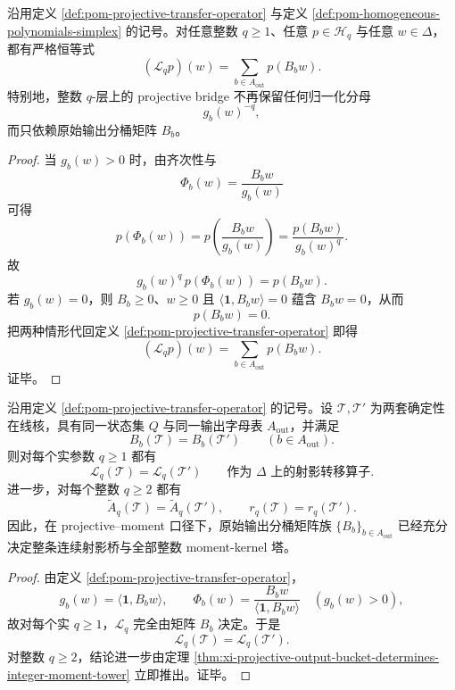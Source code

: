 \begin{theorem}\label{thm:xi-time-part9zj-integer-q-projective-bridge-denominator-annihilation}
沿用定义 \ref{def:pom-projective-transfer-operator} 与定义 \ref{def:pom-homogeneous-polynomials-simplex} 的记号。对任意整数 \(q\ge 1\)、任意 \(p\in\mathcal H_q\) 与任意 \(w\in\Delta\)，都有严格恒等式
\[
(\mathcal L_q p)(w)=\sum_{b\in A_{\mathrm{out}}}p(B_bw).
\]
特别地，整数 \(q\)-层上的 projective bridge 不再保留任何归一化分母
\[
g_b(w)^{-q},
\]
而只依赖原始输出分桶矩阵 \(B_b\)。
\end{theorem}
\begin{proof}
当 \(g_b(w)>0\) 时，由齐次性与
\[
\Phi_b(w)=\frac{B_bw}{g_b(w)}
\]
可得
\[
p(\Phi_b(w))
=
p\!\left(\frac{B_bw}{g_b(w)}\right)
=
\frac{p(B_bw)}{g_b(w)^q}.
\]
故
\[
g_b(w)^q\,p(\Phi_b(w))=p(B_bw).
\]
若 \(g_b(w)=0\)，则 \(B_b\ge 0\)、\(w\ge 0\) 且 \(\langle\mathbf 1,B_bw\rangle=0\) 蕴含 \(B_bw=0\)，从而
\[
p(B_bw)=0.
\]
把两种情形代回定义 \ref{def:pom-projective-transfer-operator} 即得
\[
(\mathcal L_q p)(w)=\sum_{b\in A_{\mathrm{out}}}p(B_bw).
\]
证毕。
\end{proof}

\begin{corollary}\label{cor:xi-time-part9zj-output-bucket-full-tower-sufficiency}
沿用定义 \ref{def:pom-projective-transfer-operator} 的记号。设 \(\mathcal T,\mathcal T'\) 为两套确定性在线核，具有同一状态集 \(Q\) 与同一输出字母表 \(A_{\mathrm{out}}\)，并满足
\[
B_b(\mathcal T)=B_b(\mathcal T')
\qquad
(b\in A_{\mathrm{out}}).
\]
则对每个实参数 \(q\ge 1\) 都有
\[
\mathcal L_q(\mathcal T)=\mathcal L_q(\mathcal T')
\qquad\text{作为 }\Delta\text{ 上的射影转移算子}.
\]
进一步，对每个整数 \(q\ge 2\) 都有
\[
\widetilde A_q(\mathcal T)=\widetilde A_q(\mathcal T'),
\qquad
r_q(\mathcal T)=r_q(\mathcal T').
\]
因此，在 projective--moment 口径下，原始输出分桶矩阵族 \(\{B_b\}_{b\in A_{\mathrm{out}}}\) 已经充分决定整条连续射影桥与全部整数 moment-kernel 塔。
\end{corollary}
\begin{proof}
由定义 \ref{def:pom-projective-transfer-operator}，
\[
g_b(w)=\langle\mathbf 1,B_bw\rangle,
\qquad
\Phi_b(w)=\frac{B_bw}{\langle\mathbf 1,B_bw\rangle}
\quad(g_b(w)>0),
\]
故对每个实 \(q\ge 1\)，\(\mathcal L_q\) 完全由矩阵 \(B_b\) 决定。于是
\[
\mathcal L_q(\mathcal T)=\mathcal L_q(\mathcal T').
\]
对整数 \(q\ge 2\)，结论进一步由定理
\ref{thm:xi-projective-output-bucket-determines-integer-moment-tower}
立即推出。证毕。
\end{proof}

